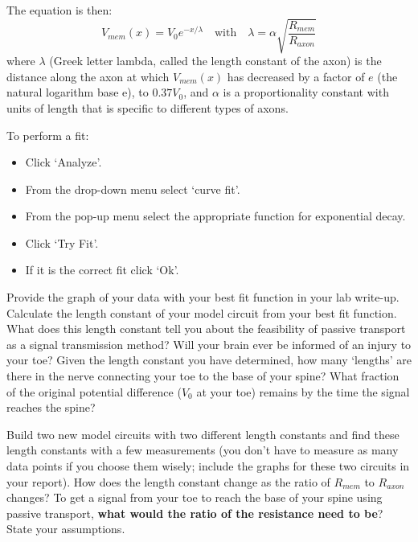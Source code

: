 The equation is then:
\[ V_{mem}(x) = V_{0} e^{-x/\lambda} \quad \textrm{with} \quad \lambda =\alpha \sqrt{\frac{R_{mem}}{R_{axon}}}  \]
where $\lambda$ (Greek letter lambda, called the length constant of the axon) is the distance along the axon at which $V_{mem}(x)$ has decreased by a factor of $e$ (the natural logarithm base e), to $0.37 V_{0}$, and $\alpha$ is a proportionality constant with units of length that is specific to different types of axons.
\par 
To perform a fit:
\begin{itemize}
\itemsep-0.2em
\item Click `Analyze'.
\item From the drop-down menu select `curve fit'.
\item From the pop-up menu select the appropriate function for exponential decay.
\item Click `Try Fit'.
\item If it is the correct fit click `Ok'.
\end{itemize}
Provide the graph of your data with your best fit function in your lab write-up.
Calculate the length constant of your model circuit from your best fit function.
What does this length constant tell you about the feasibility of passive transport as a signal transmission method?
Will your brain ever be informed of an injury to your toe?
Given the length constant you have determined, how many `lengths' are there in the nerve connecting your toe to the base of your spine?
What fraction of the original potential difference ($V_{0}$ at your toe) remains by the time the signal reaches the spine?
\par 
Build two new model circuits with two different length constants and find these length constants with a few measurements (you don't have to measure as many data points if you choose them wisely; include the graphs for these two circuits in your report).
How does the length constant change as the ratio of $R_{mem}$ to $R_{axon}$ changes?
To get a signal from your toe to reach the base of your spine using passive transport, \textbf{what would the ratio of the resistance need to be}?
State your assumptions.

\newpage


